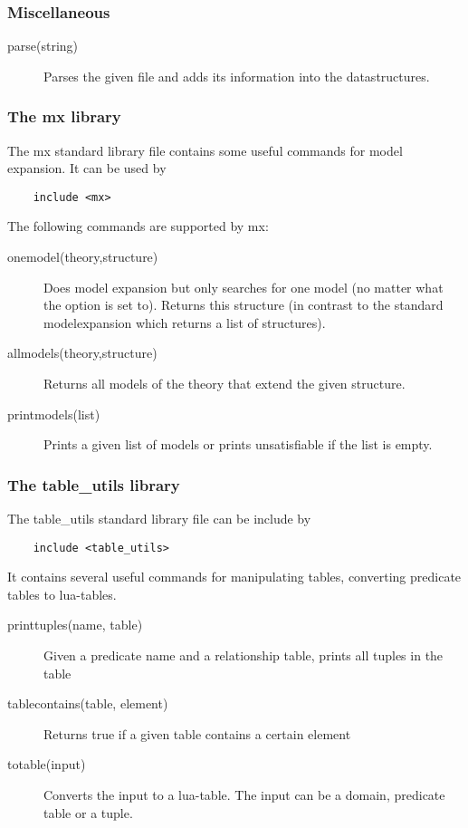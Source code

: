 \subsubsection{Miscellaneous}
\begin{description}
	
	
	\item[parse(string)]
 		Parses the given file and adds its information into the datastructures.

\end{description}





\subsubsection{The mx library}
The mx standard library file contains some useful commands for model expansion. It can be used by 
\begin{lstlisting}
	include <mx>
\end{lstlisting}
The following commands are supported by mx:
\begin{description}
	\item[onemodel(theory,structure)]
		Does model expansion but only searches for one model (no matter what the  option is set to). Returns this structure (in contrast to the standard modelexpansion which returns a list of structures).
	\item[allmodels(theory,structure)] 
		Returns all models of the theory that extend the given structure.
	\item[printmodels(list)]
		Prints a given list of models or prints unsatisfiable if the list is empty.
\end{description}

\subsubsection{The table\_utils library}
The table\_utils standard library file can be include by 
\begin{lstlisting}
	include <table_utils>
\end{lstlisting}
It contains several useful commands for manipulating tables, converting predicate tables to lua-tables.

\begin{description}
 \item[printtuples(name, table)]
	      Given a predicate name and a relationship table, prints all tuples in the table
 \item[tablecontains(table, element)]
	      Returns true if a given table contains a certain element
 \item[totable(input)]
	      Converts the input to a lua-table. The input can be a domain, predicate table or a tuple.
\end{description}



